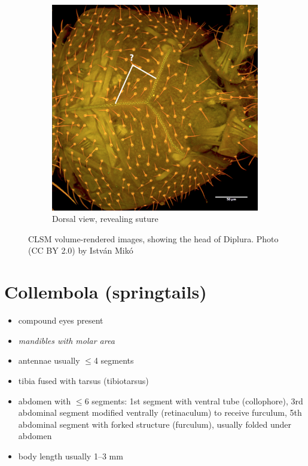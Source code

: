\documentclass[letterpaper, 11pt]{article}
\begin{document}
\begin{figure}[ht!]
\begin{subfigure}[ht!]{0.45\textwidth}
        \includegraphics[width=\textwidth]{image04}
        \caption{Dorsal view, revealing suture}
        \label{fig:dipheaddors}
    \end{subfigure}
    \caption{CLSM volume-rendered images, showing the head of Diplura. Photo (CC BY 2.0) by Istv\'an Mik\'o}\label{fig:diplurahead}
\end{figure}

\section{Collembola (springtails)}
\begin{itemize}
\item compound eyes present
\item \textit{mandibles with molar area}
\item antennae usually $\leq$4 segments
\item tibia fused with tarsus (tibiotarsus)
\item abdomen with $\leq$6 segments: 1st segment with ventral tube (collophore), 3rd abdominal segment modified ventrally (retinaculum) to receive furculum, 5th abdominal segment with forked structure (furculum), usually folded under abdomen
\item body length usually 1--3 mm
\end{itemize}
\end{document}
